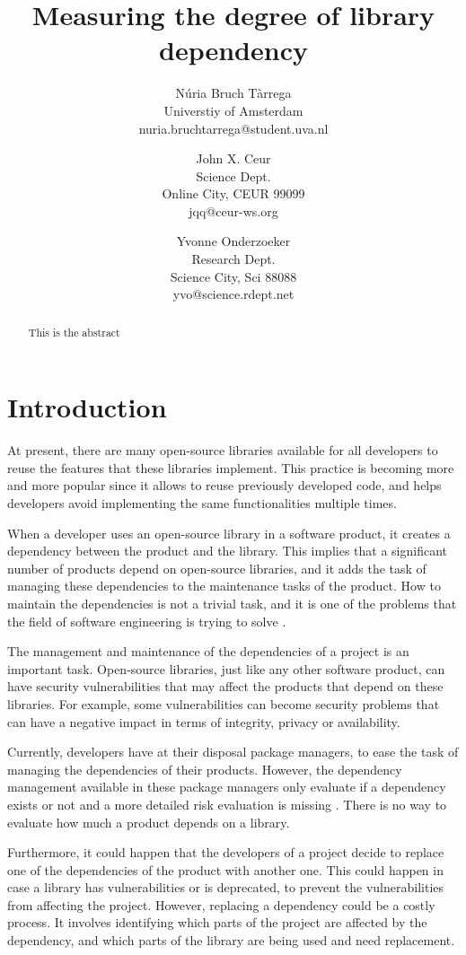 \documentclass[a4paper]{article}
\title{Measuring the degree of library dependency}
\author{
Núria Bruch Tàrrega \\ Universtiy of Amsterdam \\ nuria.bruchtarrega@student.uva.nl
\and
John X. Ceur \\ Science Dept.\\
                Online City, CEUR 99099 \\ jqq@ceur-ws.org
\and
Yvonne Onderzoeker \\ Research Dept.\\
                Science City, Sci 88088 \\ yvo@science.rdept.net
}
\begin{document}
\maketitle

\begin{abstract}
This is the abstract
\end{abstract}


\section{Introduction}
At present, there are many open-source libraries available for all developers to reuse the features that these libraries implement. This practice is becoming more and more popular since it allows to reuse previously developed code, and helps developers avoid implementing the same functionalities multiple times.

When a developer uses an open-source library in a software product, it creates a dependency between the product and the library. This implies that a significant number of products depend on open-source libraries, and it adds the task of managing these dependencies to the maintenance tasks of the product. How to maintain the dependencies is not a trivial task, and it is one of the problems that the field of software engineering is trying to solve \cite{kula2014visualizing}.

The management and maintenance of the dependencies of a project is an important task. Open-source libraries, just like any other software product, can have security vulnerabilities that may affect the products that depend on these libraries. For example, some vulnerabilities can become security problems that can have a negative impact in terms of integrity, privacy or availability.

Currently, developers have at their disposal package managers, to ease the task of managing the dependencies of their products. However, the dependency management available in these package managers only evaluate if a dependency exists or not and a more detailed risk evaluation is missing \cite{hejderup2018prazi}. There is no way to evaluate how much a product depends on a library.

Furthermore, it could happen that the developers of a project decide to replace one of the dependencies of the product with another one. This could happen in case a library has vulnerabilities or is deprecated, to prevent the vulnerabilities from affecting the project. However, replacing a dependency could be a costly process. It involves identifying which parts of the project are affected by the dependency, and which parts of the library are being used and need replacement.
\end{document}
